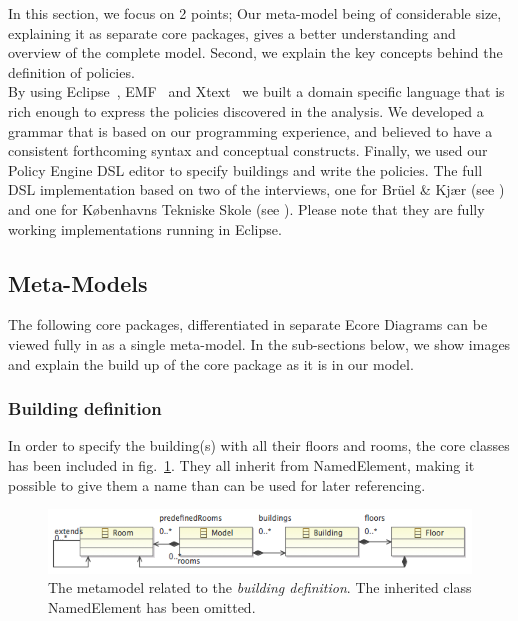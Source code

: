 In this section, we focus on 2 points; Our meta-model being of considerable size, explaining it as separate core packages, gives a better understanding and overview of the complete model. Second, we explain the key concepts behind the definition of policies.\\
 
By using Eclipse~\cite{eclipse}, EMF~\cite{emf} and Xtext~\cite{xtext} we built a domain specific language that is rich enough to express the policies discovered in the analysis. We developed a grammar that is based on our programming experience, and believed to have a consistent forthcoming syntax and conceptual constructs. Finally, we used our Policy Engine DSL editor to specify buildings and write the policies. The full DSL implementation based on two of the interviews, one for Br\"{u}el \& Kj\ae r (see ) and one for K\o benhavns Tekniske Skole (see ). Please note that they are fully working implementations running in Eclipse.

\subsection{Meta-Models}

The following core packages, differentiated in separate Ecore Diagrams can be viewed fully in  as a single meta-model. In the sub-sections below, we show images and explain the build up of the core package as it is in our model. 

\subsubsection{Building definition}
In order to specify the building(s) with all their floors and rooms, the core classes has been included in fig. \ref{fig:ecore-building-definition}. They all inherit from NamedElement, making it possible to give them a name than can be used for later referencing.
\begin{figure}[h]
  \centering \includegraphics[scale=.5]{ecore-building-definition.png}  
	\caption{The metamodel related to the \textit{building definition}. The inherited class NamedElement has been omitted.}
	\label{fig:ecore-building-definition}
\end{figure}

